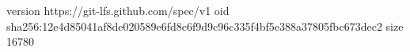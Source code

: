 version https://git-lfs.github.com/spec/v1
oid sha256:12e4d85041af8de020589e6fd8c6f9d9c96c335f4bf5e388a37805fbc673dec2
size 16780
